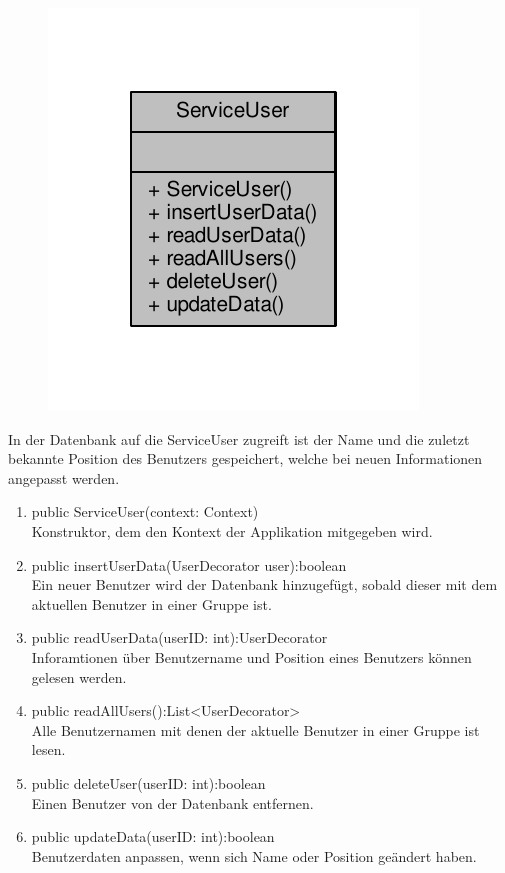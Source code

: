 \begin{figure}[H]
	\includegraphics[scale = 1]{res/umlClasses/service_user__coll__graph.pdf}
	\centering
\end{figure}
In der Datenbank auf die ServiceUser zugreift ist der Name und die zuletzt bekannte Position des Benutzers gespeichert, welche bei neuen Informationen angepasst werden. 
\begin{enumerate}
	\item public ServiceUser(context: Context)\\
		Konstruktor, dem den Kontext der Applikation mitgegeben wird.
	\item public insertUserData(UserDecorator user):boolean\\
		Ein neuer Benutzer wird der Datenbank hinzugefügt, sobald dieser mit dem aktuellen Benutzer in einer Gruppe ist.
	\item public readUserData(userID: int):UserDecorator\\
		Inforamtionen über Benutzername und Position eines Benutzers können gelesen werden.
	\item public readAllUsers():List<UserDecorator> \\
		Alle Benutzernamen mit denen der aktuelle Benutzer in einer Gruppe ist lesen.
	\item public deleteUser(userID: int):boolean\\
		Einen Benutzer von der Datenbank entfernen.
	\item public updateData(userID: int):boolean\\
		Benutzerdaten anpassen, wenn sich Name oder Position geändert haben.
\end{enumerate}

